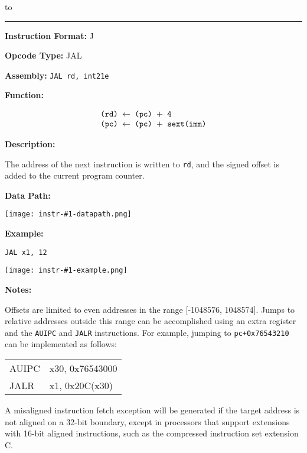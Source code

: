 \documentclass[11pt,twoside,letterpaper,titlepage]{report}
\newcommand{\minipagerestore}{
    \setlength{\parindent}{0pt}
    \setlength{\parskip}{0.5\baselineskip}
}
\newenvironment{instrheader}[5]
{%
\hbox to \textwidth{{\huge\textbf{#1}} \hfil {\Large #2}}
\rule{\textwidth}{0.4pt}

\par
\begin{minipage}{0.5\textwidth}
\textbf{Instruction Format:} #3
\end{minipage}
\begin{minipage}{0.45\textwidth}
\textbf{Opcode Type:} #4
\end{minipage}
\vspace*{0.5\baselineskip}

\par
\textbf{Assembly:} \texttt{#5}
\vspace*{0.5\baselineskip}
\ignorespacesafterend
}
{%
}
\newenvironment{instrfunction}
{%
\par
\textbf{Function:} %
}
{%
\vspace*{0.5\baselineskip}
\ignorespacesafterend
}
\newenvironment{instrdesc}
{%
\par
\textbf{Description:}
\vspace*{0.2\baselineskip}
\par
\hfill\begin{minipage}{\dimexpr\textwidth-1em}\minipagerestore
}
{%
\end{minipage}
\vspace*{\baselineskip}
\ignorespacesafterend
}
\newcommand{\instrdatapathimg}[1]{
\par
\textbf{Data Path:}
\begin{center}
\texttt{[image: instr-\#1-datapath.png]}
\end{center}
}
\newenvironment{instrexample}
{%
\par
\textbf{Example:} %
}
{%
}
\newcommand{\instrexampleimg}[1]{
\par
\begin{center}
\texttt{[image: instr-\#1-example.png]}
\end{center}    
\vspace*{0.5\baselineskip}
}
\newenvironment{instrnotes}
{%
\par
\textbf{Notes:}
\vspace*{0.3\baselineskip}
\par
\hfill\begin{minipage}{\dimexpr\textwidth-1em}\minipagerestore
}
{%
\end{minipage}
}
\begin{document}
\begin{instrheader}{JAL}{Jump and link}{J}{JAL}{JAL rd, int21e}
\end{instrheader}
\begin{instrfunction}
    \[
    \begin{tabular}{>{\ttfamily}l}
        (rd) $\leftarrow$ (pc) $+$ 4\\
        (pc) $\leftarrow$ (pc) $+$ sext(imm)
    \end{tabular}
    \]
\end{instrfunction}
\begin{instrdesc}
    The address of the next instruction is written to \texttt{rd}, and the signed offset
    is added to the current program counter.
\end{instrdesc}
\instrdatapathimg{jal}
\begin{instrexample}
    \texttt{JAL x1, 12}
\end{instrexample}
\instrexampleimg{jal}
\begin{instrnotes}
    Offsets are limited to even addresses in the range [-1048576, 1048574]. Jumps to relative
    addresses outside this range can be accomplished using an extra register and the \texttt{AUIPC}
    and \texttt{JALR} instructions. For example, jumping to \texttt{pc+0x76543210} can be
    implemented as follows:

    \par
    \begin{tabular}{>{\ttfamily}l >{\ttfamily}l}
        AUIPC & x30, 0x76543000\\
        JALR &  x1, 0x20C(x30)
    \end{tabular}
    
    \par
    A misaligned instruction fetch exception will be generated if the target address is not
    aligned on a 32-bit boundary, except in processors that support extensions with 16-bit
    aligned instructions, such as the compressed instruction set extension C.
\end{instrnotes}
\newpage
\end{document}
